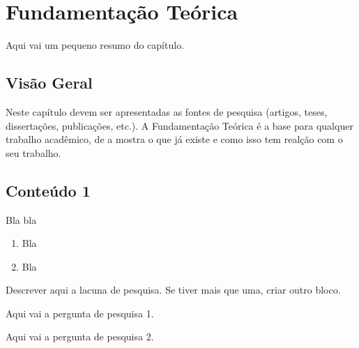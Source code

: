 \chapter{Fundamentação Teórica}
\label{ch:identificador}
	\begin{resumocapitulo}
		Aqui vai um pequeno resumo do capítulo.
	\end{resumocapitulo}

	\section{Visão Geral}
		Neste capítulo devem ser apresentadas as fontes de pesquisa (artigos, teses, dissertações, publicações, etc.). A Fundamentação Teórica é a base para qualquer trabalho acadêmico, de a mostra o que já existe e como isso tem realção com o seu trabalho.

	\section{Conteúdo 1}
	\label{sec:identificao}
        Bla bla

		\begin{enumerate}
			\item Bla
			\item Bla
		\end{enumerate}

		\begin{lacuna}
		\label{lacuna:lacuna1}
			Descrever aqui a lacuna de pesquisa. Se tiver mais que uma, criar outro bloco.
		\end{lacuna}
	
		\begin{pergunta}
		\label{pergunta:pergunta_1}
			Aqui vai a pergunta de pesquisa 1.
		\end{pergunta}

		\begin{pergunta}
		\label{pergunta:pergunta_2}
			Aqui vai a pergunta de pesquisa 2.
		\end{pergunta}	